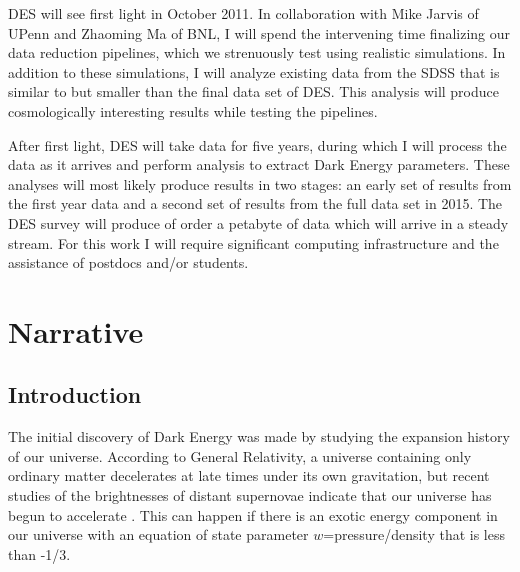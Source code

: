 \documentclass[12pt]{article}
\begin{document}
DES will see first light in October 2011.  In collaboration with Mike Jarvis of
UPenn and Zhaoming Ma of BNL, I will spend the intervening time finalizing our
data reduction pipelines, which we strenuously test using realistic
simulations.  In addition to these simulations, I will analyze existing data
from the SDSS that is similar to but smaller than the final data set of DES.
This analysis will produce cosmologically interesting results while testing the
pipelines.

After first light, DES will take data for five years, during which I will
process the data as it arrives and perform analysis to extract Dark Energy
parameters.  These analyses will most likely produce results in two stages: an
early set of results from the first year data and a second set of results from
the full data set in 2015.  The DES survey will produce of order a petabyte of
data which will arrive in a steady stream.  For this work I will require
significant computing infrastructure and the assistance of postdocs and/or
students.


\newpage
{}
\section*{Narrative}
\setcounter{section}{1}
\subsection{Introduction}

The initial discovery of Dark Energy was made by studying the expansion history
of our universe.  According to General Relativity, a universe containing only
ordinary matter decelerates at late times under its own gravitation, but recent
studies of the brightnesses of distant supernovae indicate that our universe
has begun to accelerate \cite{Riess98,Perlmutter99}.  This can happen if there
is an exotic energy component in our universe with an equation of state
parameter $w$=pressure/density that is less than -1/3.
\end{document}
